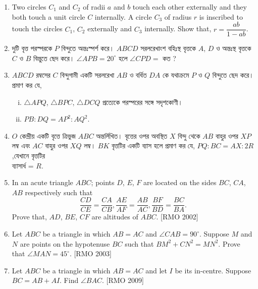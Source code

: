 \documentclass[11pt, a4paper]{article}
\begin{document}
\begin{enumerate}
	\item Two circles $C_1$ and $C_2$ of radii $a$ and $b$ touch each other externally and they both touch a unit circle $C$ internally. A circle $C_3$ of radius $r$ is inscribed to touch the circles $C_1$, $C_2$ externally and $C_3$ internally. Show that, $r = \dfrac{ab}{1-ab}$.
	
	\item \textbengali{দুটি বৃত্ত পরস্পরকে} $P$ \textbengali{বিন্দুতে অন্তঃস্পর্শ করে।} $ABCD$ \textbengali{সরলরেখাংশ বহিঃস্থ বৃত্তকে} $A$, $D$ \textbengali{ও অন্তঃস্থ বৃত্তকে} $C$ \textbengali{ও} $B$ \textbengali{বিন্তুতে ছেদ করে।} $\angle APB = 20^{\circ}$ \textbengali{হলে} $\angle CPD = $ \textbengali{কত ?}
	
	\item $ABCD$ \textbengali{রম্বসের} $C$ \textbengali{বিন্দুগামী একটি সরলরেখা} $AB$ \textbengali{ও বর্ধিত} $DA$ \textbengali{কে যথাক্রমে} $P$ \textbengali{ও} $Q$ \textbengali{বিন্দুতে ছেদ করে। প্রমাণ কর যে, }
	\begin{enumerate}[(i)]
		\item $\bigtriangleup APQ$, $\bigtriangleup BPC$, $\bigtriangleup DCQ$ \textbengali{প্রত্যেকে পরস্পরের সঙ্গে সদৃশকোণী।}
		\item $PB : DQ = AP^2 : AQ^2 $.
	\end{enumerate}
		

	\item $O$ \textbengali{কেন্দ্রীয় একটি বৃত্তে ত্রিভুজ} $ABC$ \textbengali{অন্তর্লিখিত। বৃত্তের ওপর অবস্থিত } $X$ \textbengali{বিন্দু থেকে} $AB$ \textbengali{বাহুর ওপর} $XP$ \textbengali{লম্ব এবং} $AC$ \textbengali{বাহুর ওপর} $XQ$ \textbengali{লম্ব।} $BK$ \textbengali{বৃত্তটির একটি ব্যাস হলে প্রমাণ কর যে, } $PQ : BC = AX : 2R$  ,\textbengali{যেখানে বৃত্তটির \\ ব্যাসার্ধ = } $R$.
	
	\item In an acute triangle $ABC$; points $D$, $E$, $F$ are located on the sides $BC$, $CA$, $AB$ respectively such that $$\dfrac{CD}{CE} = \dfrac{CA}{CB}, \dfrac{AE}{AF} = \dfrac{AB}{AC}, \dfrac{BF}{BD} = \dfrac{BC}{BA}.$$ Prove that, $AD$, $BE$, $CF$ are altitudes of $ABC$. [RMO 2002]
	
	\item Let $ABC$ be a triangle in which $AB=AC$ and $\angle CAB = 90^{\circ}$. Suppose $M$ and $N$ are points on the hypotenuse $BC$ such that $BM^2 + CN^2 = MN^2.$ Prove that $\angle MAN = 45^{\circ}.$ [RMO 2003]
	
	\item Let $ABC$ be a triangle in which $AB = AC$ and let $I$ be its in-centre. Suppose $BC = AB + AI$. Find $\angle BAC .$ [RMO 2009]
	

\end{enumerate}
\end{document}
